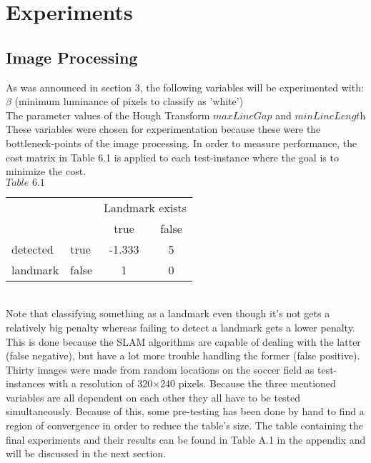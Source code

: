 \documentclass{ba-kecs}
\numberwithin{figure}{section}
\numberwithin{equation}{section}
\begin{document}
{%
\section{Experiments}

\subsection{Image Processing}
As was announced in section 3, the following variables will be experimented with: \\
$\beta$ (minimum luminance of pixels to classify as 'white')\\
The parameter values of the Hough Transform $\textit{maxLineGap}$ and $\textit{minLineLength}$ \\
These variables were chosen for experimentation because these were the bottleneck-points of the image processing. 
In order to measure performance, the cost matrix in Table 6.1 is applied to each test-instance where the goal is to minimize the cost. \\

	$\textit{Table 6.1}$ \\
\begin{tabular}{ l l|c|c| }
\multicolumn{1}{r}{} & \multicolumn{1}{r}{} & \multicolumn{2}{c}{Landmark exists} \\
\multicolumn{1}{r}{} & \multicolumn{1}{r}{}
 &  \multicolumn{1}{c}{{\small true}}
 & \multicolumn{1}{c}{{\small false}} \\
\cline{3-4}
detected & {\small true} & -1.333 & 5 \\
\cline{3-4}
landmark & {\small false} & 1 & 0 \\
\cline{3-4}
\end{tabular} \\


Note that classifying something as a landmark even though it's not gets a relatively big penalty whereas failing to detect a landmark gets a lower penalty. This is done because the SLAM algorithms are capable of dealing with the latter (false negative), but have a lot more trouble handling the former (false positive). \\
Thirty images were made from random locations on the soccer field as test-instances with a resolution of 320$\times$240 pixels.
Because the three mentioned variables are all dependent on each other they all have to be tested simultaneously. Because of this, some pre-testing has been done by hand to find a region of convergence in order to reduce the table's size. The table containing the final experiments and their results can be found in Table A.1 in the appendix and will be discussed in the next section.


}
\end{document}
